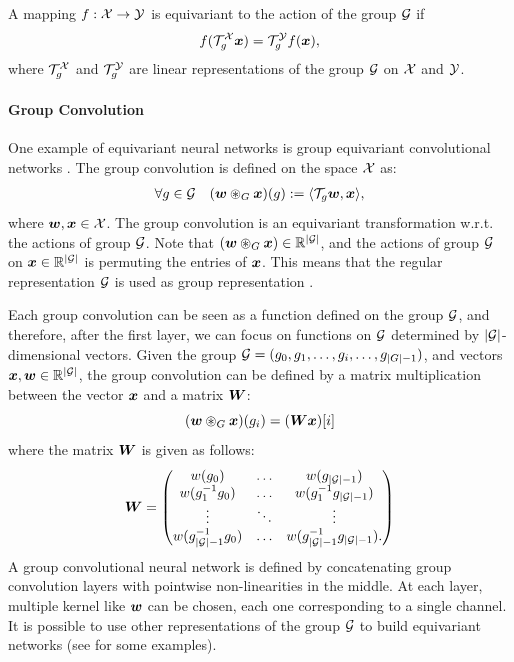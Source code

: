A mapping $f:{\mathcal{X}}\to{\mathcal{Y}}$ is equivariant to the action of the group ${\mathcal{G}}$ if
\[
f({\mathcal{T}}^{{\mathcal{X}}}_g{\bm{x}}) ={\mathcal{T}}^{{\mathcal{Y}}}_g f({\bm{x}}),
\]
where ${\mathcal{T}}^{{\mathcal{X}}}_g$ and ${\mathcal{T}}^{{\mathcal{Y}}}_g$ are linear representations of the group ${\mathcal{G}}$ on ${\mathcal{X}}$ and ${\mathcal{Y}}$. 


\paragraph{Group Convolution} One example of equivariant neural networks is  group equivariant convolutional networks \cite{cohen2016group}. 
The group convolution is defined on the space ${\mathcal{X}}$ as:
\begin{align}
    \forall g \in \gG \quad  (\vw \gconv \vx)(g) := \langle \gT_g\vw, \vx \rangle, 
\label{def:group_conv}
\end{align}
where ${\bm{w}},{\bm{x}}\in{\mathcal{X}}$. The group convolution is an equivariant transformation w.r.t. the actions of group ${\mathcal{G}}$. Note that $({\bm{w}} \circledast_{G} {\bm{x}})\in\mathbb{R}^{|{\mathcal{G}}|}$, and the actions of group ${\mathcal{G}}$ on ${\bm{x}}\in\mathbb{R}^{|{\mathcal{G}}|}$ is permuting the entries of ${\bm{x}}$. This means that the regular representation ${\mathcal{G}}$ is used as group representation \cite{serre1977linear}. 

Each group convolution can be seen as a function defined on the group ${\mathcal{G}}$, and therefore, after the first layer, we can focus on functions on ${\mathcal{G}}$ determined by $|{\mathcal{G}}|$-dimensional vectors. 
Given the group ${\mathcal{G}}=(g_0, g_1, \dots, g_i, \dots, g_{|G|-1})$, and vectors ${\bm{x}}, {\bm{w}} \in \mathbb{R}^{|{\mathcal{G}}|}$, the group convolution can be defined by a matrix multiplication between the vector ${\bm{x}}$ and a matrix ${\bm{W}}$:
\begin{equation}
    ({\bm{w}} \circledast_{G} {\bm{x}})(g_i) = ({\bm{W}}{\bm{x}})[i]
\end{equation}
where the matrix ${\bm{W}}$ is given as follows:
\begin{equation}
    \mW=\begin{pmatrix}
    w(g_0)& \dots & w(g_{|\gG|-1})\\
    w(g_1^{-1}g_0) & \dots&   w(g_1^{-1}g_{|\gG|-1})\\
    \vdots &\ddots &\vdots \\
    w(g_{|\gG|-1}^{-1}g_0) & \dots&   w(g_{|\gG|-1}^{-1}g_{|\gG|-1}).\\
    \end{pmatrix}
\label{eq:group_circulant}
\end{equation}
A group convolutional neural network is defined by concatenating group convolution layers with pointwise non-linearities in the middle. At each layer, multiple 
kernel like ${\bm{w}}$ can be chosen, each one corresponding to a single channel. It is possible to use other representations of the group ${\mathcal{G}}$ to build equivariant networks (see \cite{cohen_steerable_2016,e2cnn} for some examples). 

